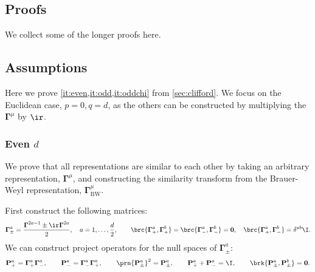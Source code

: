 \documentclass[11pt]{article}
\newcommand{\Gammab}{\boldsymbol{\Gamma}}
\begin{document}
\begin{appendix}

\section{Proofs}\label{sec:proofs}

We collect some of the longer proofs here.



\subsection{Assumptions}\label{sec:assume}

Here we prove \cref{it:even,it:odd,it:oddchi} from \cref{sec:clifford}.
We focus on the Euclidean case, \(p = 0, q = d\), as the others can be constructed by multiplying the \(\Gammab^\mu\) by \(\ir\).


\subsubsection{Even \texorpdfstring{\(d\)}{d}}\label{sec:evenclass}

We prove that all representations are similar to each other by taking an arbitrary representation, \(\Gammab^\mu\), and constructing the similarity transform from the Brauer-Weyl representation, \(\Gammab^\mu_\text{BW}\).

First construct the following matrices:
%
\begin{equation}\label{eq:raiselower}
  \Gammab^a_\pm = \frac{\Gammab^{2a-1} \pm \ir \Gammab^{2a}}{2},
  \quad a = 1,\dots,\frac{d}{2}, \qquad
  \brc{\Gammab_+^a, \Gammab_+^b} = \brc{\Gammab_-^a, \Gammab_-^b} = \mathbf{0},
  \quad \brc{\Gammab_+^a, \Gammab_-^b} = \delta^{ab} \I.
\end{equation}
%
We can construct project operators for the null spaces of \(\Gammab^a_\pm\):
%
\begin{equation*}
  \mathbf{P}^a_+ = \Gammab^a_+ \Gammab^a_-, \qquad
  \mathbf{P}^a_- = \Gammab^a_- \Gammab^a_+, \qquad
  \prn{\mathbf{P}^a_\pm}^2 = \mathbf{P}^a_\pm, \qquad
  \mathbf{P}^a_+ + \mathbf{P}^a_- = \I, \qquad
  \brk{\mathbf{P}^a_\pm, \mathbf{P}^b_\pm} = \mathbf{0}.
\end{equation*}
%




\end{appendix}


\end{document}
